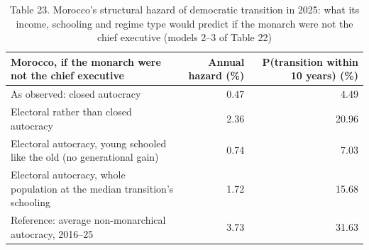 \begin{table}
\caption{Table 23. Morocco's structural hazard of democratic transition in 2025: what its income, schooling and regime type would predict if the monarch were not the chief executive (models 2–3 of Table 22)}
\label{tab:T23_morocco_hazard}
\begin{tabular}{lrr}
\toprule
Morocco, if the monarch were not the chief executive & Annual hazard (\%) & P(transition within 10 years) (\%) \\
\midrule
As observed: closed autocracy & 0.47 & 4.49 \\
Electoral rather than closed autocracy & 2.36 & 20.96 \\
Electoral autocracy, young schooled like the old (no generational gain) & 0.74 & 7.03 \\
Electoral autocracy, whole population at the median transition's schooling & 1.72 & 15.68 \\
Reference: average non-monarchical autocracy, 2016–25 & 3.73 & 31.63 \\
\bottomrule
\end{tabular}
\end{table}
